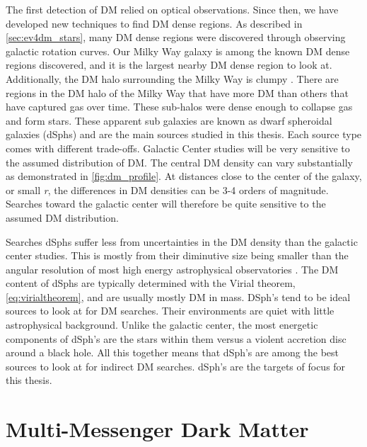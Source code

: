 The first detection of DM relied on optical observations.
Since then, we have developed new techniques to find DM dense regions.
As described in \cref{sec:ev4dm_stars}, many DM dense regions were discovered through observing galactic rotation curves.
Our Milky Way galaxy is among the known DM dense regions discovered, and it is the largest nearby DM dense region to look at.
Additionally, the DM halo surrounding the Milky Way is clumpy \cite{Tracy:les_houches}.
There are regions in the DM halo of the Milky Way that have more DM than others that have captured gas over time.
These sub-halos were dense enough to collapse gas and form stars.
These apparent sub galaxies are known as dwarf spheroidal galaxies (dSphs) and are the main sources studied in this thesis.
Each source type comes with different trade-offs.
Galactic Center studies will be very sensitive to the assumed distribution of DM.
The central DM density can vary substantially as demonstrated in \cref{fig:dm_profile}.
At distances close to the center of the galaxy, or small \textit{r}, the differences in DM densities can be 3-4 orders of magnitude.
Searches toward the galactic center will therefore be quite sensitive to the assumed DM distribution.

Searches dSphs suffer less from uncertainties in the DM density than the galactic center studies.
This is mostly from their diminutive size being smaller than the angular resolution of most high energy astrophysical observatories \cite{Tracy:les_houches}.
The DM content of dSphs are typically determined with the Virial theorem, \cref{eq:virialtheorem}, and are usually mostly DM \cite{Tracy:les_houches} in mass.
DSph's tend to be ideal sources to look at for DM searches.
Their environments are quiet with little astrophysical background.
Unlike the galactic center, the most energetic components of dSph's are the stars within them versus a violent accretion disc around a black hole.
All this together means that dSph's are among the best sources to look at for indirect DM searches.
dSph's are the targets of focus for this thesis.

\section{Multi-Messenger Dark Matter \label{sec:mult-messengerDM}}

